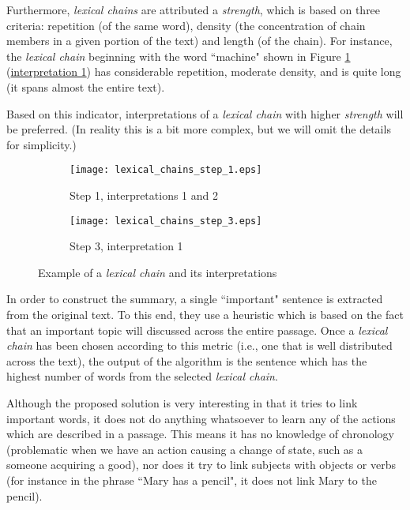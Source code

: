 Furthermore, \textit{lexical chains} are attributed a \textit{strength}, which is based on three criteria: repetition (of the same word), density (the concentration of chain members in a given portion of the text) and length (of the chain). For instance, the \textit{lexical chain} beginning with the word ``machine" shown in Figure \ref{fig:lexical_chain_example} (\underline{interpretation 1}) has considerable repetition, moderate density, and is quite long (it spans almost the entire text).

Based on this indicator, interpretations of a \textit{lexical chain} with higher \textit{strength} will be preferred. (In reality this is a bit more complex, but we will omit the details for simplicity.)

\begin{figure}[H]
\centering
\begin{subfigure}{0.45\textwidth}
\texttt{[image: lexical\_chains\_step\_1.eps]}
\caption{Step 1, interpretations 1 and 2}
\end{subfigure}
\begin{subfigure}{0.35\textwidth}
\texttt{[image: lexical\_chains\_step\_3.eps]}
\caption{Step 3, interpretation 1}
\end{subfigure}
\caption{\cite{barzilay_using_1997} Example of a \textit{lexical chain} and its interpretations}
\label{fig:lexical_chain_example}
\end{figure}

In order to construct the summary, a single ``important" sentence is extracted from the original text. To this end, they use a heuristic which is based on the fact that an important topic will discussed across the entire passage. Once a \textit{lexical chain} has been chosen according to this metric (i.e., one that is well distributed across the text), the output of the algorithm is the sentence which has the highest number of words from the selected \textit{lexical chain}.

\mbox{}

Although the proposed solution is very interesting in that it tries to link important words, it does not do anything whatsoever to learn any of the actions which are described in a passage. This means it has no knowledge of chronology (problematic when we have an action causing a change of state, such as a someone acquiring a good), nor does it try to link subjects with objects or verbs (for instance in the phrase ``Mary has a pencil", it does not link Mary to the pencil).

